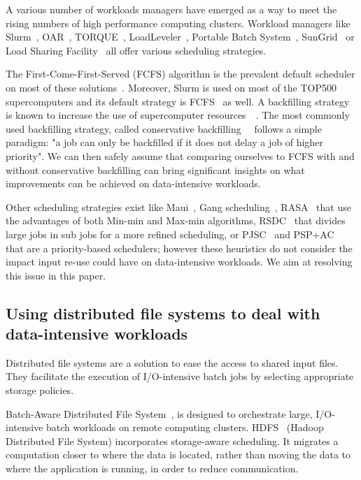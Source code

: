\documentclass[conference,10pt]{IEEEtran}
\begin{document}
A various number of workloads managers have emerged 
as a way to meet the rising numbers of high performance computing clusters.
Workload managers like Slurm~\cite{SLURM}, OAR~\cite{oar},
TORQUE~\cite{torque}, LoadLeveler~\cite{loadleveler},
Portable Batch System~\cite{pbs}, SunGrid~\cite{sungrid}
or Load Sharing Facility~\cite{lsf} all offer
various scheduling strategies.

The First-Come-First-Served (FCFS) algorithm is the prevalent default
scheduler on most of these solutions~\cite{survey_workload_manager_and_scheduler}.
Moreover, Slurm is used on most of the TOP500 supercomputers and its default strategy is FCFS~\cite{slurm_website_scheduling} as well.
A backfilling strategy is known to increase
the use of supercomputer resources~\cite{maui}~\cite{New_Backfill}. 
The most commonly used backfilling strategy, called conservative 
backfilling~\cite{Characterization_of_Backfilling}~\cite{Introducing-New-Backfill-based} follows
a simple paradigm: "a job can only be backfilled if it does not
delay a job of higher priority".
We can then safely assume that comparing ourselves to FCFS with and without conservative backfilling can 
bring significant insights on what improvements can be achieved on data-intensive workloads.

Other scheduling strategies exist like 
Maui~\cite{Maui_Scheduler}, Gang scheduling~\cite{gang_scheduling}, 
RASA~\cite{rasa} that use the advantages of both Min-min and Max-min algorithms,
RSDC~\cite{rsdc} that divides large jobs in sub jobs for a more refined scheduling,
or PJSC~\cite{pjsc} and PSP+AC~\cite{PSP_AC} that are a priority-based schedulers; 
however these heuristics do not consider the impact
input re-use could have on data-intensive workloads.
We aim at resolving this issue in this paper.

\subsection{Using distributed file systems to deal with data-intensive workloads}

Distributed file systems are a solution to ease the access to 
shared input files. They facilitate the execution of I/O-intensive batch
jobs by selecting appropriate storage policies.

Batch-Aware Distributed File System~\cite{Explicit_Control_in_a_Batch-Aware_Distributed_File_System},
is designed to orchestrate large, I/O-intensive batch workloads on remote computing clusters.
HDFS~\cite{hdfs} (Hadoop Distributed File System)
incorporates storage-aware scheduling. 
It migrates a computation closer to where the data is
located, rather than moving the data to where the application is
running, in order to reduce communication.
\end{document}
